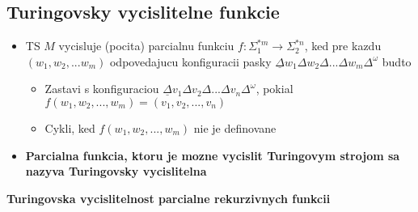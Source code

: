 \documentclass[12pt]{article}
\begin{document}
\subsection*{Turingovsky vycislitelne funkcie}
\begin{itemize}
	\item TS $M$ vycisluje (pocita) parcialnu funkciu $f: \Sigma_{1}^{*m} \to \Sigma_{2}^{*n}$, ked pre kazdu
		$(w_{1},w_{2},...w_{m})$ odpovedajucu konfiguracii pasky $\underline{\Delta}w_{1}\Delta w_{2}\Delta...\Delta w_{m}\Delta^{\omega}$
		budto
		\begin{itemize}
			\item Zastavi s konfiguraciou $\underline{\Delta}v_{1}\Delta v_{2}\Delta...\Delta v_{n}\Delta^{\omega}$,
				pokial $f(w_{1},w_{2},...,w_{m}) = (v_{1},v_{2},...,v_{n})$
			\item Cykli, ked $f(w_{1},w_{2},...,w_{m})$ nie je definovane
		\end{itemize}
	\item \textbf{Parcialna funkcia, ktoru je mozne vycislit Turingovym strojom sa nazyva Turingovsky vycislitelna}
\end{itemize}
\textbf{Turingovska vycislitelnost parcialne rekurzivnych funkcii}
\end{document}
